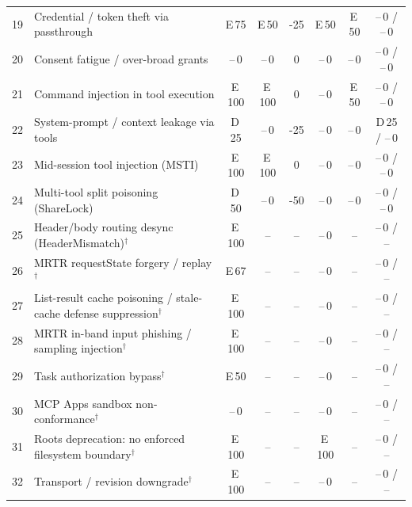 \begin{tabular}{@{}rl ccc ccc@{}}
19 & Credential / token theft via passthrough & E\,75 & E\,50 & -25 & E\,50 & E\,50 & --\,0 / --\,0 \\
20 & Consent fatigue / over-broad grants & --\,0 & --\,0 & 0 & --\,0 & --\,0 & --\,0 / --\,0 \\
21 & Command injection in tool execution & E\,100 & E\,100 & 0 & --\,0 & E\,50 & --\,0 / --\,0 \\
22 & System-prompt / context leakage via tools & D\,25 & --\,0 & -25 & --\,0 & --\,0 & D\,25 / --\,0 \\
23 & Mid-session tool injection (MSTI) & E\,100 & E\,100 & 0 & --\,0 & --\,0 & --\,0 / --\,0 \\
24 & Multi-tool split poisoning (ShareLock) & D\,50 & --\,0 & -50 & --\,0 & --\,0 & --\,0 / --\,0 \\
25 & Header/body routing desync (HeaderMismatch)$^{\dagger}$ & E\,100 & \multicolumn{1}{c}{--} & -- & --\,0 & -- & --\,0 / -- \\
26 & MRTR requestState forgery / replay$^{\dagger}$ & E\,67 & \multicolumn{1}{c}{--} & -- & --\,0 & -- & --\,0 / -- \\
27 & List-result cache poisoning / stale-cache defense suppression$^{\dagger}$ & E\,100 & \multicolumn{1}{c}{--} & -- & --\,0 & -- & --\,0 / -- \\
28 & MRTR in-band input phishing / sampling injection$^{\dagger}$ & E\,100 & \multicolumn{1}{c}{--} & -- & --\,0 & -- & --\,0 / -- \\
29 & Task authorization bypass$^{\dagger}$ & E\,50 & \multicolumn{1}{c}{--} & -- & --\,0 & -- & --\,0 / -- \\
30 & MCP Apps sandbox non-conformance$^{\dagger}$ & --\,0 & \multicolumn{1}{c}{--} & -- & --\,0 & -- & --\,0 / -- \\
31 & Roots deprecation: no enforced filesystem boundary$^{\dagger}$ & E\,100 & \multicolumn{1}{c}{--} & -- & E\,100 & -- & --\,0 / -- \\
32 & Transport / revision downgrade$^{\dagger}$ & E\,100 & \multicolumn{1}{c}{--} & -- & --\,0 & -- & --\,0 / -- \\
\bottomrule
\end{tabular}

